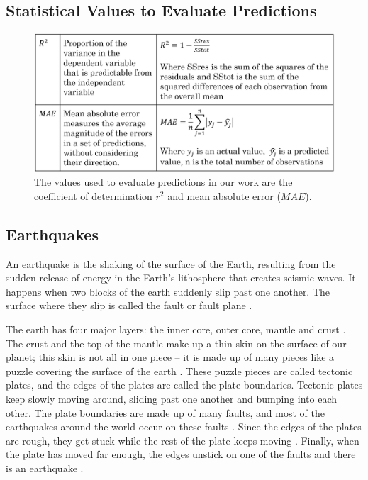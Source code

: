 \documentclass[]{llncs} %
\begin{document}
\subsection{Statistical Values to Evaluate Predictions}
\begin{figure}
	\centering
	\includegraphics[width=.9\linewidth]{background}
	\caption{The values used to evaluate predictions in our work are the coefficient of determination $r^2$ and mean absolute error ($MAE$).}
	\label{fig:background}
\end{figure}

\subsection{Earthquakes}
An earthquake is the shaking of the surface of the Earth, resulting from the sudden release of energy in the Earth’s lithosphere that creates seismic waves. It happens when two blocks of the earth suddenly slip past one another. The surface where they slip is called the fault or fault plane \cite{Wald}. \par

The earth has four major layers: the inner core, outer core, mantle and crust \cite{Wald}. The crust and the top of the mantle make up a thin skin on the surface of our
planet; this skin is not all in one piece – it is made up of many pieces like a puzzle covering the surface of the earth \cite{Wald}. These puzzle pieces are called tectonic plates, and the edges of the plates are called the plate boundaries. Tectonic plates keep slowly moving around, sliding past one another and bumping into each other. The plate boundaries are made up of many faults, and most of the earthquakes around the world occur on these faults \cite{Wald}. Since the edges of the plates are rough, they get stuck while the rest of the plate keeps moving \cite{Wald}. Finally, when the plate has moved far enough, the edges unstick on one of the faults and there is an earthquake \cite{Wald}. \par
\end{document}
